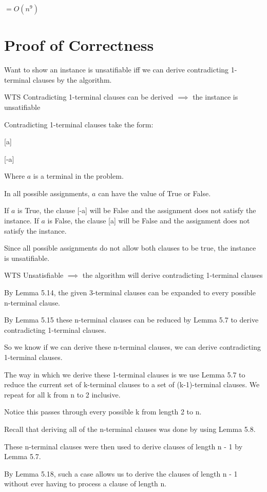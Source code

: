 \documentclass[manuscript]{acmart}
\begin{document}
    $= O(n^9)$

    \section{Proof of Correctness}

    Want to show an instance is unsatifiable iff we can derive contradicting
    1-terminal clauses by the algorithm.

    WTS Contradicting 1-terminal clauses can be derived $\implies$ the instance is unsatifiable

    Contradicting 1-terminal clauses take the form:

    [a]

    [-a]

    Where $a$ is a terminal in the problem.

    In all possible assignments, $a$ can have the value of True or False.

    If $a$ is True, the clause [-a] will be False and the assignment does not satisfy the instance.
    If $a$ is False, the clause [a] will be False and the assignment does not satisfy the instance.

    Since all possible assignments do not allow both clauses to be true, 
    the instance is unsatifiable.

    WTS Unsatisfiable $\implies$ the algorithm will derive contradicting 1-terminal clauses

    By Lemma 5.14, the given 3-terminal clauses can be expanded to every
    possible n-terminal clause.

    By Lemma 5.15 these n-terminal clauses can be reduced by Lemma 5.7
    to derive contradicting 1-terminal clauses.

    So we know if we can derive these n-terminal clauses, we can derive
    contradicting 1-terminal clauses.

    The way in which we derive these 1-terminal clauses is we use
    Lemma 5.7 to reduce the current set of k-terminal clauses to
    a set of (k-1)-terminal clauses. We repeat for all k from n to 2
    inclusive.

    Notice this passes through every possible k from length 2 to n.

    Recall that deriving all of the n-terminal clauses was done by using
    Lemma 5.8.

    These n-terminal clauses were then used to derive clauses of length n - 1
    by Lemma 5.7.

    By Lemma 5.18, such a case allows us to derive the clauses of length n - 1
    without ever having to process a clause of length n.
\end{document}
